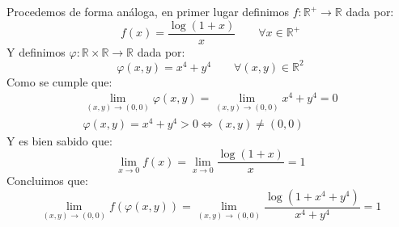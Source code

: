 \begin{ejercicio}
\begin{enumerate}
            Procedemos de forma análoga, en primer lugar definimos $f:\mathbb{R}^+ \to \mathbb{R}$ dada por:
            \begin{equation*}
                f(x) = \dfrac{\log(1+x)}{x} \qquad \forall x\in \mathbb{R}^+
            \end{equation*}
            Y definimos $\varphi:\mathbb{R}\times \mathbb{R} \to \mathbb{R}$ dada por:
            \begin{equation*}
                \varphi(x,y) = x^4+y^4 \qquad \forall (x,y)\in \mathbb{R}^2
            \end{equation*}
            Como se cumple que:
            \begin{gather*}
                \lim_{(x,y)\to(0,0)}\varphi(x,y) = \lim_{(x,y)\to(0,0)}x^4+y^4 =  0 \\
                \varphi(x,y) = x^4+y^4 > 0 \Longleftrightarrow (x,y) \neq (0,0) 
            \end{gather*}
            Y es bien sabido que:
            \begin{equation*}
                \lim_{x\to0}f(x) = \lim_{x\to0}\dfrac{\log(1+x)}{x} = 1
            \end{equation*}
            Concluimos que:
            \begin{equation*}
                \lim_{(x,y)\to(0,0)}f(\varphi(x,y)) = \lim_{(x,y)\to(0,0)}\dfrac{\log(1+x^4+y^4)}{x^4+y^4} = 1
            \end{equation*}
    \end{enumerate}
\end{ejercicio}
